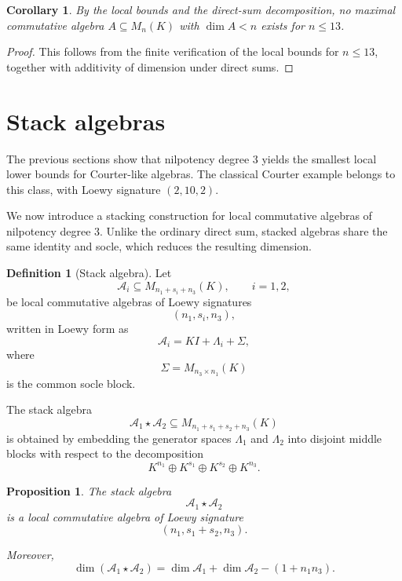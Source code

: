 \documentclass[11pt]{article}
\theoremstyle{remark}
\theoremstyle{plain}
\newtheorem{proposition}[theorem]{Proposition}
\newtheorem{corollary}[theorem]{Corollary}
\theoremstyle{definition}
\newtheorem{definition}[theorem]{Definition}
\theoremstyle{myremark}
\begin{document}
\begin{corollary}
	By the local bounds and the direct-sum decomposition, no maximal
	commutative algebra \(A\subseteq M_n(K)\) with \(\dim A<n\) exists for
	\(n\le13\).
\end{corollary}

\begin{proof}
	This follows from the finite verification of the local bounds for
	\(n\le13\), together with additivity of dimension under direct sums.
\end{proof}
	
\section{Stack algebras}

The previous sections show that nilpotency degree \(3\) yields the
smallest local lower bounds for Courter-like algebras. The classical
Courter example belongs to this class, with Loewy signature \((2,10,2)\).


 We now introduce a stacking construction for local commutative algebras
of nilpotency degree \(3\). Unlike the ordinary direct sum, stacked
algebras share the same identity and socle, which reduces the resulting
dimension.

\begin{definition}[Stack algebra]
	Let
	\[
	\mathcal A_i\subseteq M_{n_1+s_i+n_3}(K),
	\qquad i=1,2,
	\]
	be local commutative algebras of Loewy signatures
	\[
	(n_1,s_i,n_3),
	\]
	written in Loewy form as
	\[
	\mathcal A_i = KI+\Lambda_i+\Sigma,
	\]
	where
	\[
	\Sigma=M_{n_3\times n_1}(K)
	\]
	is the common socle block.
	
	The stack algebra
	\[
	\mathcal A_1\star\mathcal A_2
	\subseteq
	M_{n_1+s_1+s_2+n_3}(K)
	\]
	is obtained by embedding the generator spaces
	\(\Lambda_1\) and \(\Lambda_2\) into disjoint middle blocks with respect
	to the decomposition
	\[
	K^{n_1}\oplus K^{s_1}\oplus K^{s_2}\oplus K^{n_3}.
	\]
\end{definition}

\begin{proposition}
	The stack algebra
	\[	\mathcal A_1\star\mathcal A_2	\]
	is a local commutative algebra of Loewy signature
	\[	(n_1,s_1+s_2,n_3).	\]
	
	Moreover,
	\[	\dim(\mathcal A_1\star\mathcal A_2)	=
	\dim\mathcal A_1+\dim\mathcal A_2-(1+n_1n_3).	\]
\end{proposition}
\end{document}
